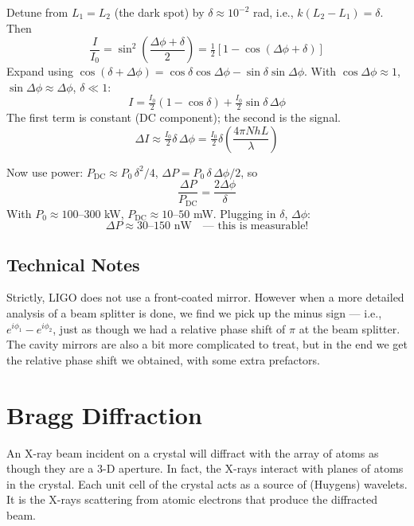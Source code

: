 \documentclass[11pt]{report}
\begin{document}
Detune from $L_1 = L_2$ (the dark spot) by $\delta \approx 10^{-2}$ rad, i.e., $k(L_2 - L_1) = \delta$. Then
\begin{equation}
\frac{I}{I_0} = \sin^2\!\left(\frac{\Delta\phi + \delta}{2}\right) = \tfrac{1}{2}\!\left[1 - \cos(\Delta\phi + \delta)\right]
\end{equation}
Expand using $\cos(\delta + \Delta\phi) = \cos\delta\cos\Delta\phi - \sin\delta\sin\Delta\phi$. With $\cos\Delta\phi \approx 1$, $\sin\Delta\phi \approx \Delta\phi$, $\delta \ll 1$:
\begin{equation}
I = \tfrac{I_0}{2}(1 - \cos\delta) + \tfrac{I_0}{2}\sin\delta \,\Delta\phi
\end{equation}
The first term is constant (DC component); the second is the signal.
\begin{equation}
\Delta I \approx \tfrac{I_0}{2}\delta\,\Delta\phi = \tfrac{I_0}{2}\delta\!\left(\frac{4\pi N hL}{\lambda}\right)
\end{equation}

Now use power: $P_{\text{DC}} \approx P_0\,\delta^2/4$, $\Delta P = P_0\,\delta\,\Delta\phi/2$, so
\begin{equation}
\frac{\Delta P}{P_{\text{DC}}} = \frac{2\Delta\phi}{\delta}
\end{equation}
With $P_0 \approx 100$--$300$ kW, $P_{\text{DC}} \approx 10$--$50$ mW. Plugging in $\delta$, $\Delta\phi$:
\begin{equation}
\Delta P \approx 30\text{--}150\text{ nW} \quad \text{--- this is measurable!}
\end{equation}

\subsection*{Technical Notes}

Strictly, LIGO does not use a front-coated mirror. However when a more detailed analysis of a beam splitter is done, we find we pick up the minus sign --- i.e., $e^{i\phi_1} - e^{i\phi_2}$, just as though we had a relative phase shift of $\pi$ at the beam splitter. The cavity mirrors are also a bit more complicated to treat, but in the end we get the relative phase shift we obtained, with some extra prefactors.

\section{Bragg Diffraction}

An X-ray beam incident on a crystal will diffract with the array of atoms as though they are a 3-D aperture. In fact, the X-rays interact with planes of atoms in the crystal. Each unit cell of the crystal acts as a source of (Huygens) wavelets. It is the X-rays scattering from atomic electrons that produce the diffracted beam.
\end{document}
